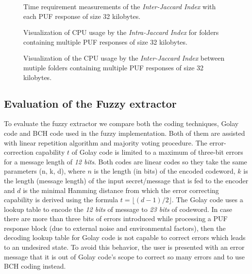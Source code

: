 \begin{figure}[b!]
\centering
{}
\caption{Time requirement measurements of the \emph{Inter-Jaccard Index} with each PUF response of size 32 kilobytes.}
\label{img:time_inter}
\end{figure}

\begin{figure}[t!]
\centering
{}
\caption{Visualization of CPU usage by the \emph{Intra-Jaccard Index} for folders containing multiple PUF responses of size 32 kilobytes.}
\label{img:cpu_intra}
\end{figure}

\begin{figure}[b!]
\centering
{}
\caption{Visualization of the CPU usage by the \emph{Inter-Jaccard Index} between mutiple folders containing multiple PUF responses of size 32 kilobytes.}
\label{img:cpu_inter}
\end{figure}

\clearpage

\subsection{Evaluation of the Fuzzy extractor}

To evaluate the fuzzy extractor we compare both the coding techniques, Golay code and BCH code used in the fuzzy implementation. Both of them are assisted with linear repetition algorithm and majority voting procedure. The error-correction capability $t$ of Golay code is limited to a maximum of three-bit errors for a message length of \emph{12 bits}. Both codes are linear codes so they take the same parameters (n, k, d), where $n$ is the length (in bits) of the encoded codeword, $k$ is the
length (message length) of the input secret/message that is fed to the encoder and $d$ is the minimal Hamming distance from which the error correcting capability is derived using the formula $t = \lfloor(d-1)/2\rfloor$. The Golay code uses a lookup table to encode the \emph{12 bits} of message to \emph{23 bits} of codeword. In case there are more than three bits of errors introduced while processing a PUF response block (due to external noise and environmental factors), then the decoding lookup
table for Golay code is not capable to correct errors which leads to an undesired state. To avoid this behavior, the user is presented with an error message that it is out of Golay code's scope to correct so many errors and to use BCH coding instead.\\

